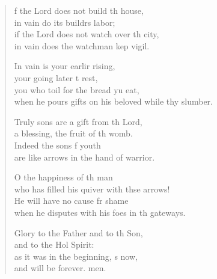 \begin{verse}
  \begin{patverse}
f the Lord does not build th house,\Med\\
in vain do its buildrs labor;\\
if the Lord does not watch over th city,\Med\\
in vain does the watchman kep vigil.

In vain is your earlir rising,\Med\\
your going later t rest,\\
you who toil for the bread yu eat,\Med\\
when he pours gifts on his beloved while thy slumber.

Truly sons are a gift from th Lord,\Med\\
a blessing, the fruit of th womb.\\
Indeed the sons f youth\Med\\
are like arrows in the hand of  warrior.

O the happiness of th man\Med\\
who has filled his quiver with thse arrows!\\
He will have no cause fr shame\Med\\
when he disputes with his foes in th gateways.

Glory to the Father and to th Son,\Med\\
and to the Hol Spirit:\\
as it was in the beginning, \pointup{\i}s now,\Med\\
and will be forever. men. 
  \end{patverse}
\end{verse}
